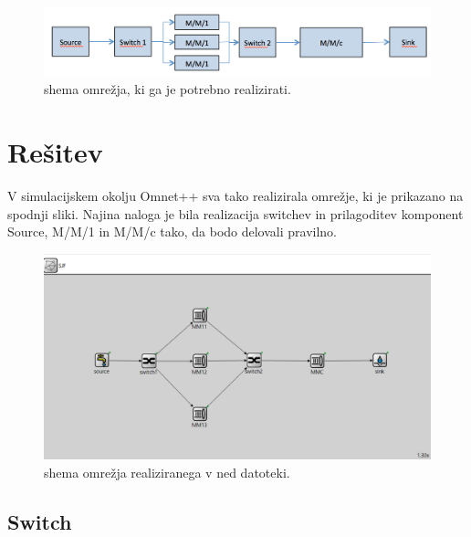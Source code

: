 \documentclass[a4paper,11pt]{article}
\begin{document}
\begin{figure}[htbp]
\begin{center}
\includegraphics[scale=0.6]{shema.png}
\caption{shema omrežja, ki ga je potrebno realizirati.}
\label{Slika1}
\end{center}
\end{figure}

\section{Rešitev}

V simulacijskem okolju Omnet++ sva tako realizirala omrežje, ki je prikazano na spodnji sliki. Najina naloga je bila realizacija switchev in prilagoditev komponent Source, M/M/1 in M/M/c tako, da bodo delovali pravilno.
\begin{figure}[htbp]
\begin{center}
\includegraphics[scale=0.6]{omrezje.png}
\caption{shema omrežja realiziranega v ned datoteki.}
\label{Slika2}
\end{center}
\end{figure}

\subsection{Switch}
\end{document}
